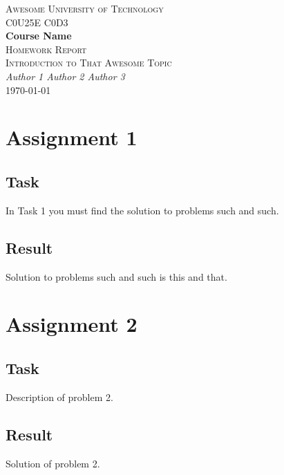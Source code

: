 \documentclass[12pt, a4paper, final, onecolumn, oneside]{article}
\begin{document}
\begin{titlepage}
	\centering
	{\scshape\LARGE Awesome University of Technology \\}
	\vspace{1.4in}
	{\scshape\Large C0U25E C0D3  \\}
	\vspace{0.1in}
	{\LARGE\bfseries Course Name \\}
	\vspace{1.4in}
	{\scshape\LARGE Homework Report \\}
	\vspace{0.1in}
	{\scshape\Large Introduction to That Awesome Topic \\}
	\vspace{1.4in}
	{\Large\itshape Author 1 \hfill Author 2 \hfill Author 3 \\}
	\vfill
	{\large \today \\}
\end{titlepage}

\section*{Assignment 1}

\subsection*{Task}

In Task 1 you must find the solution to problems such and such.

\subsection*{Result}

Solution to problems such and such is this and that.

\section*{Assignment 2}

\subsection*{Task}

Description of problem 2.

\subsection*{Result}

Solution of problem 2.
\end{document}
